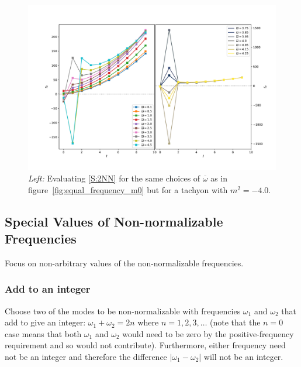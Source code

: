 \documentclass[letterpaper,11pt]{article}
\newcommand{\ob}{\overline{\omega}}
\begin{document}
\begin{figure}[h]
\centering
\includegraphics[width=\textwidth]{./figures/NN_equalfreq_sourceterms_m-4_0+zoom}
\caption{{\it Left:} Evaluating \eqref{S:2NN} for the same choices of $\ob$ as in figure~\ref{fig:equal_frequency_m0} but for a tachyon with $m^2 = -4.0$.}
\label{fig:equal_frequency_m-4_0}
\end{figure}


\subsection{Special Values of Non-normalizable Frequencies}

Focus on non-arbitrary values of the non-normalizable frequencies.

\subsubsection{Add to an integer}
\label{ssec: add to integer}

Choose two of the modes to be non-normalizable with frequencies $\omega_1$ and $\omega_2$ that add to give an integer: $\omega_1 + \omega_2 = 2n$ where $n = 1, 2, 3, \ldots$ (note that the $n = 0$ case means that both $\omega_1$ and $\omega_2$ would need to be zero by the positive-frequency requirement and so would not contribute). Furthermore, either frequency need not be an integer and therefore the difference $|\omega_1 - \omega_2|$ will not be an integer. 
\end{document}
